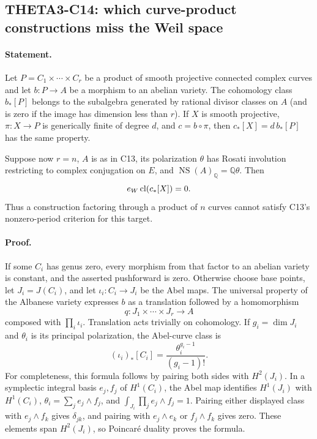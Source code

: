 \documentclass[11pt]{article}
\newcommand{\Q}{\mathbb Q}\newcommand{\C}{\mathbb C}\newcommand{\Z}{\mathbb Z}\newcommand{\R}{\mathbb R}\newcommand{\A}{\mathbb A}\newcommand{\OO}{\mathcal O}
\theoremstyle{definition}\newtheorem{definition}[theorem]{Definition}\newtheorem{remark}[theorem]{Remark}
\begin{document}
\subsection{THETA3-C14: which curve-product constructions miss the Weil space}\label{C14}

\paragraph{Statement.}
Let $P=C_1\times\cdots\times C_r$ be a product of smooth projective
connected complex curves and let $b:P\to A$ be a morphism to an abelian
variety. The cohomology class $b_*[P]$ belongs to the subalgebra
generated by rational divisor classes on $A$ (and is zero if the
image has dimension less than $r$). If $X$ is smooth projective,
$\pi:X\to P$ is generically finite of degree $d$, and $c=b\circ\pi$, then
$c_*[X]=d\,b_*[P]$ has the same property.

Suppose now $r=n$, $A$ is as in C13, its polarization $\theta$ has
Rosati involution restricting to complex conjugation on $E$, and
$\operatorname{NS}(A)_\Q=\Q\theta$. Then
\[
 e_W\operatorname{cl}(c_*[X])=0.
\]
Thus a construction factoring through a product of $n$ curves cannot
satisfy C13's nonzero-period criterion for this target.

\paragraph{Proof.}
If some $C_i$ has genus zero, every morphism from that factor to an
abelian variety is constant, and the asserted pushforward is zero.
Otherwise choose base points, let $J_i=J(C_i)$, and let
$\iota_i:C_i\to J_i$ be the Abel maps. The universal property of
the Albanese variety expresses $b$ as a translation followed by a
homomorphism
\[
 q:J_1\times\cdots\times J_r\longrightarrow A
\]
composed with $\prod_i\iota_i$. Translation acts trivially on
cohomology. If $g_i=\dim J_i$ and $\theta_i$ is its principal
polarization, the Abel-curve class is
\[
 (\iota_i)_*[C_i]=\frac{\theta_i^{g_i-1}}{(g_i-1)!}.
\]
For completeness, this formula follows by pairing both sides with
$H^2(J_i)$. In a symplectic integral basis $e_j,f_j$ of $H^1(C_i)$,
the Abel map identifies $H^1(J_i)$ with $H^1(C_i)$,
$\theta_i=\sum_j e_j\wedge f_j$, and
$\int_{J_i}\prod_j e_j\wedge f_j=1$. Pairing either displayed class
with $e_j\wedge f_k$ gives $\delta_{jk}$, and pairing with
$e_j\wedge e_k$ or $f_j\wedge f_k$ gives zero. These elements span
$H^2(J_i)$, so Poincar\'e duality proves the formula.
\end{document}

